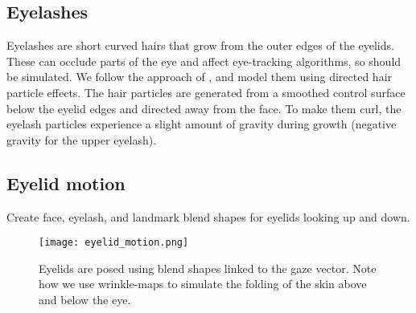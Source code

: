 \subsection{Eyelashes}

Eyelashes are short curved hairs that grow from the outer edges of the eyelids. These can occlude parts of the eye and affect eye-tracking algorithms, so should be simulated. We follow the approach of \citet{swirski2014rendering}, and model them using directed hair particle effects. The hair particles are generated from a smoothed control surface below the eyelid edges and directed away from the face. To make them curl, the eyelash particles experience a slight amount of gravity during growth (negative gravity for the upper eyelash).

\subsection{Eyelid motion}

Create face, eyelash, and landmark blend shapes for eyelids looking up and down.

\begin{figure}
    \texttt{[image: eyelid\_motion.png]}
    \caption{Eyelids are posed using blend shapes linked to the gaze vector. Note how we use wrinkle-maps to simulate the folding of the skin above and below the eye.}
\end{figure}
